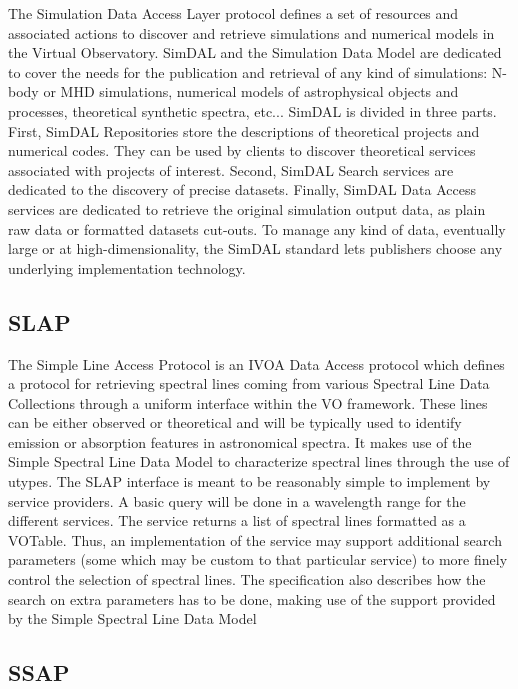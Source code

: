 \documentclass[11pt,a4paper]{ivoa}
\begin{document}
The Simulation Data Access Layer protocol defines a set of resources and associated 
actions to discover and retrieve simulations and numerical models in the Virtual Observatory. 
SimDAL and the Simulation Data Model are dedicated to cover the needs for the publication 
and retrieval of any kind of simulations: N-body or MHD simulations, numerical models of 
astrophysical objects and processes, theoretical synthetic spectra, etc... SimDAL is 
divided in three parts. First, SimDAL Repositories store the descriptions of theoretical 
projects and numerical codes. They can be used by clients to discover theoretical 
services associated with projects of interest. Second, SimDAL Search services are 
dedicated to the discovery of precise datasets. Finally, SimDAL Data Access services 
are dedicated to retrieve the original simulation output data, as plain raw data or 
formatted datasets cut-outs. To manage any kind of data, eventually large or at 
high-dimensionality, the SimDAL standard lets publishers choose any underlying 
implementation technology. 

\subsection{SLAP}

The Simple Line Access Protocol is an IVOA Data Access protocol which defines a protocol 
for retrieving spectral lines coming from various Spectral Line Data Collections through a 
uniform interface within the VO framework. These lines can be either observed or theoretical 
and will be typically used to identify emission or absorption features in astronomical 
spectra. It makes use of the Simple Spectral Line Data Model to characterize spectral lines 
through the use of utypes. The SLAP interface is meant to be reasonably simple to implement 
by service providers. A basic query will be done in a wavelength range for the different 
services. The service returns a list of spectral lines formatted as a VOTable. Thus, an 
implementation of the service may support additional search parameters (some which may be 
custom to that particular service) to more finely control the selection of spectral lines.
The specification also describes how the search on extra parameters has to be done, making 
use of the support provided by the Simple Spectral Line Data Model

\subsection{SSAP}
\end{document}
